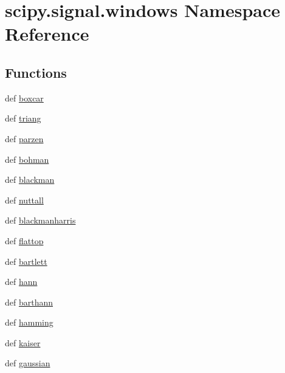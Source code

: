 \hypertarget{namespacescipy_1_1signal_1_1windows}{}\section{scipy.\+signal.\+windows Namespace Reference}
\label{namespacescipy_1_1signal_1_1windows}
\subsection*{Functions}
\begin{DoxyCompactItemize}
\item 
def \hyperlink{namespacescipy_1_1signal_1_1windows_aa87cdbe07202ca582fbf5dff9aefb182}{boxcar}
\item 
def \hyperlink{namespacescipy_1_1signal_1_1windows_a247179942b79396efbec6fc9410eacad}{triang}
\item 
def \hyperlink{namespacescipy_1_1signal_1_1windows_ad950410c579524d4f5a3ac32e796c96e}{parzen}
\item 
def \hyperlink{namespacescipy_1_1signal_1_1windows_a443764fca2e3b676a2848dc72b9922fb}{bohman}
\item 
def \hyperlink{namespacescipy_1_1signal_1_1windows_a9c011ba894f282c9bdf41bab1e98cc78}{blackman}
\item 
def \hyperlink{namespacescipy_1_1signal_1_1windows_a790d1b7a5cdc9ad681a9ece510348391}{nuttall}
\item 
def \hyperlink{namespacescipy_1_1signal_1_1windows_a99b1e85701207b578a9507920c90f2ec}{blackmanharris}
\item 
def \hyperlink{namespacescipy_1_1signal_1_1windows_a59fdc70d84272da80278ca21dd7745fe}{flattop}
\item 
def \hyperlink{namespacescipy_1_1signal_1_1windows_af26dd7863b2073e64991fa2a71a321e2}{bartlett}
\item 
def \hyperlink{namespacescipy_1_1signal_1_1windows_a25f492c76fc589606b17d08ceb04bafd}{hann}
\item 
def \hyperlink{namespacescipy_1_1signal_1_1windows_a7883d59937f93c12d04fa2681c464736}{barthann}
\item 
def \hyperlink{namespacescipy_1_1signal_1_1windows_a3f268a66ca50c39fd0acb58369571391}{hamming}
\item 
def \hyperlink{namespacescipy_1_1signal_1_1windows_a6dd2261f91e939b40c65142c538873f5}{kaiser}
\item 
def \hyperlink{namespacescipy_1_1signal_1_1windows_aabe275e734bd4fcd0a0152469e17d2c7}{gaussian}

\end{DoxyCompactItemize}
